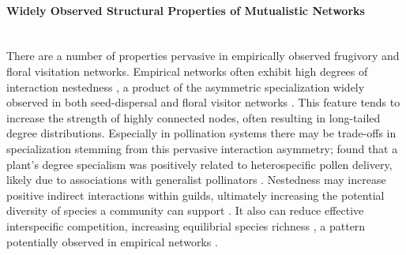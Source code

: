 \paragraph*{Widely Observed Structural Properties of Mutualistic Networks}\mbox{}\\ 
There are a number of properties pervasive in empirically observed frugivory and floral visitation networks. Empirical networks often exhibit high degrees of interaction nestedness \parencite{fortuna2006habitat, bascompte2006asymmetric}, a product of the asymmetric specialization widely observed in both seed-dispersal \parencite{yohe2025frugivore, schleuning2014loss} and floral visitor networks \parencite{bascompte2003nested}. This feature tends to increase the strength of highly connected nodes, often resulting in long-tailed degree distributions. Especially in pollination systems there may be trade-offs in specialization stemming from this pervasive interaction asymmetry; \parencite{arceo2020plant} found that a plant's degree specialism was positively related to heterospecific pollen delivery, likely due to associations with generalist pollinators \parencite{arceo2020plant}. Nestedness may increase positive indirect interactions within guilds, ultimately increasing the potential diversity of species a community can support \parencite{bascompte2003nested, guimaraes2017indirect}. It also can reduce effective interspecific competition, increasing equilibrial species richness \parencite{bastolla2009architecture}, a pattern potentially observed in empirical networks \parencite{Gonzales2015macroecology}. 

